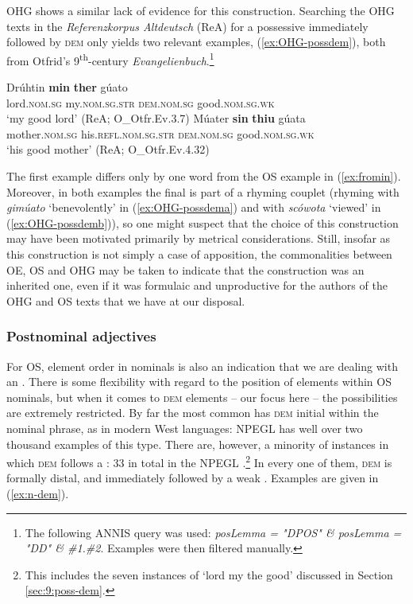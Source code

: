 \documentclass[output=paper,colorlinks,citecolor=brown]{langscibook}
\begin{document}
OHG shows a similar lack of evidence for this construction. Searching the OHG texts in the \textit{Referenzkorpus Altdeutsch} (ReA) for a possessive immediately followed by \textsc{dem} only yields two relevant examples, (\ref{ex:OHG-possdem}), both from Otfrid's 9\textsuperscript{th}-century \textit{Evangelienbuch}.\footnote{The following ANNIS query was used: \textit{posLemma = "DPOS" \& posLemma = "DD" \& \#1.\#2}. Examples were then filtered manually.}

\begin{exe}
 \ex\label{ex:OHG-possdem}
 \begin{xlist}
  \ex \label{ex:OHG-possdema} \gll Drúhtin \textbf{min} \textbf{ther} gúato\\
  lord.\textsc{nom.sg} my.\textsc{nom.sg.str} \textsc{dem.nom.sg} good.\textsc{nom.sg.wk}\\
  \glt `my good lord' (ReA; O\_Otfr.Ev.3.7)
  \ex \label{ex:OHG-possdemb} \gll Múater \textbf{sin} \textbf{thiu} gúata\\
  mother.\textsc{nom.sg} his.\textsc{refl.nom.sg.str} \textsc{dem.nom.sg} good.\textsc{nom.sg.wk}\\
  \glt `his good mother' (ReA; O\_Otfr.Ev.4.32)
 \end{xlist}
\end{exe}

The first example differs only by one word from the OS example in (\ref{ex:fromin}). Moreover, in both examples the final  is part of a rhyming couplet (rhyming with \textit{gimúato} `benevolently' in (\ref{ex:OHG-possdema}) and with \textit{scówota} `viewed' in (\ref{ex:OHG-possdemb})), so one might suspect that the choice of this construction may have been motivated primarily by metrical considerations. Still, insofar as this construction is not simply a case of apposition, the commonalities between OE, OS and OHG may be taken to indicate that the construction was an inherited one, even if it was formulaic and unproductive for the authors of the OHG and OS texts that we have at our disposal.

\subsubsection{Postnominal adjectives}\label{sec:9:postnom}

For OS, element order in nominals is also an indication that we are dealing with an . There is some flexibility with regard to the position of elements within OS nominals, but when it comes to \textsc{dem} elements -- our focus here -- the possibilities are extremely restricted. By far the most common  has \textsc{dem} initial within the nominal phrase, as in modern West  languages: NPEGL has well over two thousand examples of this type. There are, however, a minority of instances in which \textsc{dem} follows a : 33 in total in the NPEGL .\footnote{This includes the seven instances of `lord my the good' discussed in Section \ref{sec:9:poss-dem}.} In every one of them, \textsc{dem} is formally distal, and immediately followed by a weak . Examples are given in (\ref{ex:n-dem}).
\end{document}
